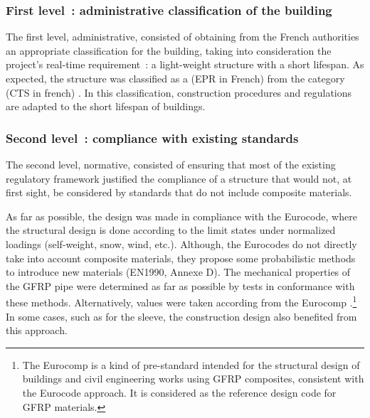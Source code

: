 \subsubsection{First level~: administrative classification of the building}
The first level, administrative, consisted of obtaining from the French authorities an appropriate classification for the building, taking into
consideration the project’s real-time requirement~: a light-weight structure with a short lifespan. As expected, the structure was classified as a  (EPR in French) from the category  (CTS in french) \cite{SiteSecurite}. In this classification, construction procedures and regulations are adapted to the short lifespan of buildings.

\subsubsection{Second level~: compliance with existing standards}
The second level, normative, consisted of ensuring that most of the existing regulatory framework justified the compliance of a structure that would not, at first sight, be considered by standards that do not include composite materials.

As far as possible, the design was made in compliance with the Eurocode, where the structural design is done according to the limit states under normalized loadings (self-weight, snow, wind, etc.). Although, the Eurocodes do not directly take into account composite materials, they propose some probabilistic methods to introduce new materials (EN1990, Annexe D). The mechanical properties of the GFRP pipe were determined as far as possible by tests in conformance with these methods. Alternatively, values were taken according from the Eurocomp \cite{Clarke2003}.\footnote{The Eurocomp is a kind of pre-standard intended for the structural design of buildings and civil engineering works using GFRP composites, consistent with the Eurocode approach. It is considered as the reference design code for GFRP materials.} In some cases, such as for the sleeve, the construction design also benefited from this approach.

